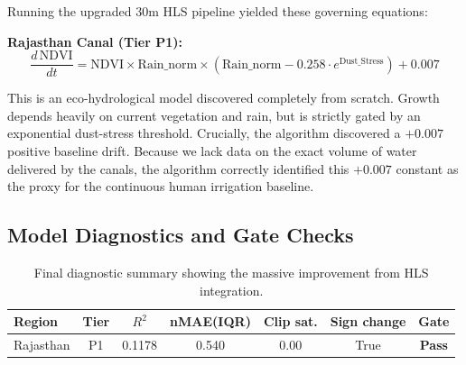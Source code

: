 \documentclass[12pt, a4paper]{article}
\begin{document}
Running the upgraded 30m HLS pipeline yielded these governing equations:

\textbf{Rajasthan Canal (Tier P1):}
\begin{equation}
    \frac{d\,\text{NDVI}}{dt} = \text{NDVI} \times \text{Rain\_norm} \times (\text{Rain\_norm} - 0.258 \cdot e^{\text{Dust\_Stress}}) + 0.007
    \label{eq:raj_final}
\end{equation}

This is an eco-hydrological model discovered completely from scratch. Growth depends heavily on current vegetation and rain, but is strictly gated by an exponential dust-stress threshold. Crucially, the algorithm discovered a $+0.007$ positive baseline drift. Because we lack data on the exact volume of water delivered by the canals, the algorithm correctly identified this $+0.007$ constant as the proxy for the continuous human irrigation baseline.

\subsection{Model Diagnostics and Gate Checks}

\begin{table}[H]
\centering
\caption{Final diagnostic summary showing the massive improvement from HLS integration.}
\label{tab:diagnostics}
\begin{tabular}{p{3.0cm}cccccc}
\toprule
\textbf{Region} & \textbf{Tier} & \textbf{$R^2$} & \textbf{nMAE(IQR)} & \textbf{Clip sat.} & \textbf{Sign change} & \textbf{Gate} \\
\midrule
Rajasthan & P1 & 0.1178 & 0.540 & 0.00 & True & \textcolor{notegreen}{\textbf{Pass}} \\
\bottomrule
\end{tabular}
\end{table}

\begin{table}[H]
\centering
\caption{Detailed reliability checks (Note: r2\_ok is now True).}
\label{tab:reliability}
\end{table}
\end{document}
